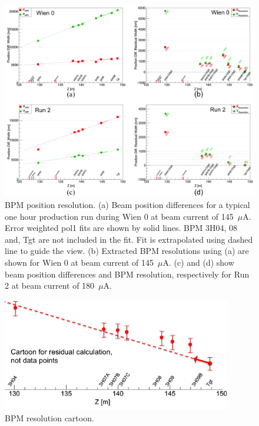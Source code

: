 \begin{singlespace}
\begin{figure}[!h]
	\begin{center}
	\includegraphics[width=15.0cm]{figures/bpmPositionResolution}
	\end{center}
	\caption
	{BPM position resolution. (a) Beam position differences for a typical one hour production run during Wien 0 at beam current of 145~$\mu$A. Error weighted pol1 fits are shown by solid lines. BPM 3H04, 08 and, Tgt are not included in the fit. Fit is extrapolated using dashed line to guide the view. (b) Extracted BPM resolutions using (a) are shown for Wien 0 at beam current of 145~$\mu$A. (c) and (d) show beam position differences and BPM resolution, respectively for Run 2 at beam current of 180~$\mu$A.}
	\label{fig:bpmPositionResolution}
\end{figure}
\end{singlespace}

\begin{singlespace}
\begin{figure}[!h]
	\begin{center}
	\includegraphics[width=10.0cm]{figures/bpmPositionResolutionCartoon}
	\end{center}
	\caption
	{BPM resolution cartoon.}
	\label{fig:bpmPositionResolutionCartoon}
\end{figure}
\end{singlespace}

